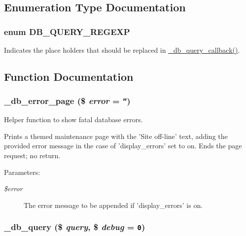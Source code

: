 \subsection{Enumeration Type Documentation}
\hypertarget{group__database_gac2405479299ce848b4c294cdba9b046}{
\subsubsection[{DB\_\-QUERY\_\-REGEXP}]{\setlength{\rightskip}{0pt plus 5cm}enum {\bf DB\_\-QUERY\_\-REGEXP}}}
\label{group__database_gac2405479299ce848b4c294cdba9b046}


Indicates the place holders that should be replaced in \hyperlink{group__database_g337493a6287b3b48a5a2ba6d74e844bf}{\_\-db\_\-query\_\-callback()}. 

\subsection{Function Documentation}
\hypertarget{group__database_g5aab9d68ecdc1712369d5d1ef64d455c}{
\subsubsection[{\_\-db\_\-error\_\-page}]{\setlength{\rightskip}{0pt plus 5cm}\_\-db\_\-error\_\-page (\$ {\em error} = {\tt ''})}}
\label{group__database_g5aab9d68ecdc1712369d5d1ef64d455c}


Helper function to show fatal database errors.

Prints a themed maintenance page with the 'Site off-line' text, adding the provided error message in the case of 'display\_\-errors' set to on. Ends the page request; no return.

\begin{Desc}
\item[Parameters:]
\begin{description}
\item[{\em \$error}]The error message to be appended if 'display\_\-errors' is on. \end{description}
\end{Desc}
\hypertarget{group__database_gf0a663e6a6aaf095f78a77c871b8028b}{
\subsubsection[{\_\-db\_\-query}]{\setlength{\rightskip}{0pt plus 5cm}\_\-db\_\-query (\$ {\em query}, \/  \$ {\em debug} = {\tt 0})}}
\label{group__database_gf0a663e6a6aaf095f78a77c871b8028b}


